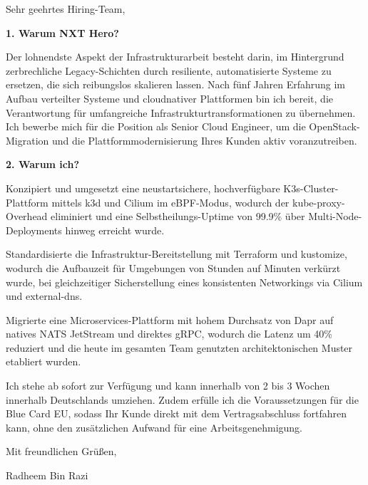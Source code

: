 \documentclass[11pt,a4paper]{coverletter}
\begin{document}
\opening{Sehr geehrtes Hiring-Team,}

\vspace{8pt}\noindent\textbf{1. Warum NXT Hero?}\par\vspace{3pt}

Der lohnendste Aspekt der Infrastrukturarbeit besteht darin, im Hintergrund zerbrechliche Legacy-Schichten durch resiliente, automatisierte Systeme zu ersetzen, die sich reibungslos skalieren lassen. Nach fünf Jahren Erfahrung im Aufbau verteilter Systeme und cloudnativer Plattformen bin ich bereit, die Verantwortung für umfangreiche Infrastrukturtransformationen zu übernehmen. Ich bewerbe mich für die Position als Senior Cloud Engineer, um die OpenStack-Migration und die Plattformmodernisierung Ihres Kunden aktiv voranzutreiben.

\vspace{8pt}\noindent\textbf{2. Warum ich?}\par\vspace{3pt}

\bullets

  \item Konzipiert und umgesetzt eine neustartsichere, hochverfügbare K3s-Cluster-Plattform mittels k3d und Cilium im eBPF-Modus, wodurch der kube-proxy-Overhead eliminiert und eine Selbstheilungs-Uptime von 99.9\% über Multi-Node-Deployments hinweg erreicht wurde.

  \item Standardisierte die Infrastruktur-Bereitstellung mit Terraform und kustomize, wodurch die Aufbauzeit für Umgebungen von Stunden auf Minuten verkürzt wurde, bei gleichzeitiger Sicherstellung eines konsistenten Networkings via Cilium und external-dns.

  \item Migrierte eine Microservices-Plattform mit hohem Durchsatz von Dapr auf natives NATS JetStream und direktes gRPC, wodurch die Latenz um 40\% reduziert und die heute im gesamten Team genutzten architektonischen Muster etabliert wurden.

\bulletsend

Ich stehe ab sofort zur Verfügung und kann innerhalb von 2 bis 3 Wochen innerhalb Deutschlands umziehen. Zudem erfülle ich die Voraussetzungen für die Blue Card EU, sodass Ihr Kunde direkt mit dem Vertragsabschluss fortfahren kann, ohne den zusätzlichen Aufwand für eine Arbeitsgenehmigung.

\closing{Mit freundlichen Grüßen,}{Radheem Bin Razi}
\end{document}
